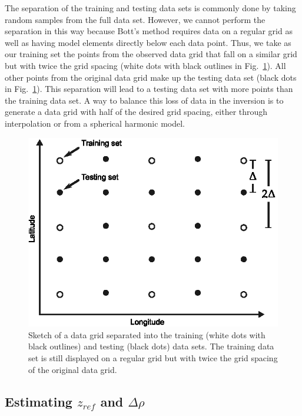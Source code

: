 \documentclass[extra,mreferee]{gji}
\begin{document}
The separation of the training and testing data sets is commonly done by taking
random samples from the full data set.
However, we cannot perform the separation in this way because
Bott's method requires data on a regular grid as well as having model elements
directly below each data point.
Thus, we take as our training set the points from the observed data grid that
fall on a similar grid but with twice the grid spacing
(white dots with black outlines in Fig.~\ref{fig:grid_separation}).
All other points from the original data grid
make up the testing data set
(black dots in Fig.~\ref{fig:grid_separation}).
This separation will lead to
a testing data set with more points than the training data set.
A way to balance this loss of data in the inversion
is to generate a data grid with half of the desired grid spacing,
either through interpolation
or from a spherical harmonic model.


\begin{figure}
    \centering
    \includegraphics{figures/cv-grid-separation}
    \caption{Sketch of a data grid separated into
        the training (white dots with black outlines)
        and testing (black dots) data sets.
        The training data set is still displayed on a regular grid
        but with twice the grid spacing
        of the original data grid.}
    \label{fig:grid_separation}
\end{figure}



\subsection{Estimating $z_{ref}$ and $\Delta\rho$}
\end{document}
